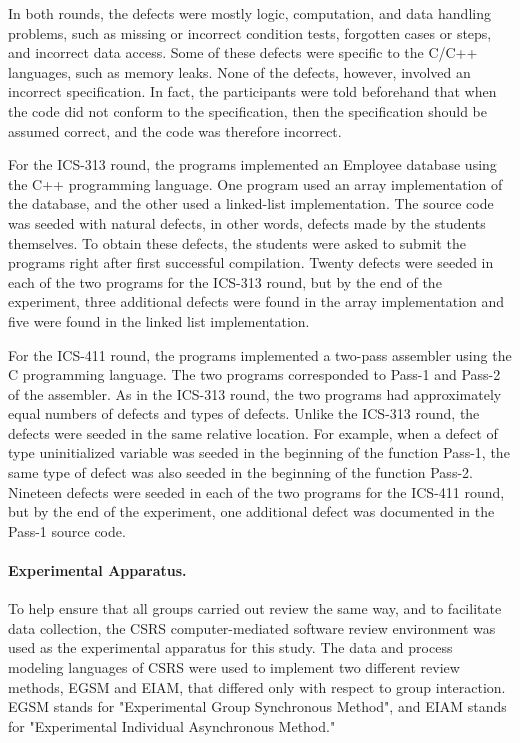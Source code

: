 In both rounds, the defects were mostly logic, computation, and data
handling problems, such as missing or incorrect condition tests, forgotten
cases or steps, and incorrect data access. Some of these defects were
specific to the C/C++ languages, such as memory leaks.  None of the defects,
however, involved an incorrect specification. In fact, the participants
were told beforehand that when the code did not conform to the
specification, then the specification should be assumed correct, and the
code was therefore incorrect.

For the ICS-313 round, the programs implemented an Employee database using
the C++ programming language. One program used an array implementation of
the database, and the other used a linked-list implementation.  The source
code was seeded with natural defects, in other words, defects made by the students
themselves. To obtain these defects, the students were asked to submit the
programs right after first successful compilation.  Twenty defects were
seeded in
each of the two programs for the ICS-313 round, but by the end of the
experiment, three additional defects were found in the array implementation and 
five were found in the linked list implementation.

For the ICS-411 round, the programs implemented a two-pass assembler using
the C programming language. The two programs corresponded to Pass-1 and
Pass-2 of the assembler. As in the ICS-313 round, the two
programs had approximately equal numbers of defects and types of defects.
Unlike the ICS-313 round, the defects were seeded in the same relative
location.  For example, when a defect of type uninitialized variable was
seeded in the beginning of the function Pass-1, the same type of defect was
also seeded in the beginning of the function Pass-2.  Nineteen defects
were seeded in each of the two programs for the ICS-411 round, but by the end of the
experiment, one additional defect was documented in the Pass-1 source code.



\paragraph{Experimental Apparatus.}

To help ensure that all groups carried out review the same way, and to 
facilitate data collection, the CSRS computer-mediated software
review environment was used as the experimental apparatus for this study.  The
data and process modeling languages of CSRS were used to implement two
different review methods, EGSM and EIAM,  that differed only with respect 
to group interaction. EGSM stands for "Experimental Group Synchronous Method",
and EIAM stands for "Experimental Individual Asynchronous Method."

